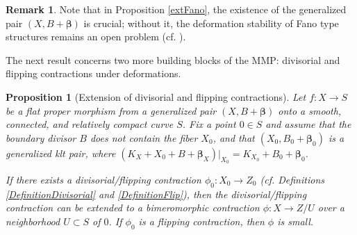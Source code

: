 \documentclass[12pt]{amsart}
\numberwithin{equation}{section}
\newtheorem{proposition}[theorem]{Proposition}
\theoremstyle{definition}
\theoremstyle{plain}
\newtheorem*{thm A*}{Theorem A}
\newtheorem*{thm B*}{Theorem B}
\newtheorem*{thm C*}{Theorem C}
\newtheorem*{thm D*}{Theorem D}
\theoremstyle{definition}
\newtheorem{remark}  [theorem]     {Remark}
\renewcommand{\1}{\mathds{1}}
\newcommand{\bbeta}{\boldsymbol{\beta}}
\renewcommand{\>}{\rightarrow}
\begin{document}
\begin{remark}
Note that in Proposition \ref{extFano}, the existence of the generalized pair $(X,B+\bbeta )$ is crucial; without it, the deformation stability of Fano type structures remains an open problem (cf. \cite[Question 1.1]{CLZ25}).
\end{remark}

The next result concerns two more building blocks of the MMP: divisorial and flipping contractions under deformations.

\begin{proposition}[Extension of divisorial and flipping contractions]\label{ContInMMP}
Let $f:X\to S$ be a flat proper morphism from a generalized pair $(X,B+ { \boldsymbol{\beta}})$ onto a smooth, connected, and relatively compact curve $S$. Fix a point $0\in S$ and assume that the boundary divisor $B$ does not contain the fiber $X_0$, and that $(X_0,B_0 + { \boldsymbol{\beta}}_0)$ is a generalized klt pair, where $(K_X+X_0+B+\bbeta _X)|_{X_0}=K_{X_0}+B_0+\bbeta _0$. 

If there exists a divisorial/flipping contraction $\phi_0:X_0 \to Z_0$ (cf. Definitions \ref{DefinitionDivisorial} and \ref{DefinitionFlip}), then the divisorial/flipping contraction can be extended to a bimeromorphic contraction $\phi:X\to Z/U$ over a neighborhood $U \subset S$ of $0$. If $\phi _0$ is a flipping contraction, then $\phi$ is small.
\end{proposition}
\end{document}
